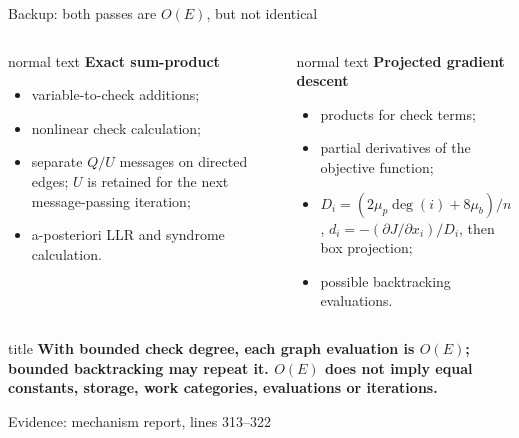 \documentclass[aspectratio=169,9pt,t]{beamer}
\newcommand{\evidence}[1]{%
  \vfill\hfill{\fontsize{5.8}{6.8}\selectfont\color{Muted}Evidence: #1}}
\newcommand{\takeaway}[1]{%
  \begin{beamercolorbox}[rounded=true,sep=1.5ex]{title}
    \centering\normalsize\bfseries #1
  \end{beamercolorbox}}
\begin{document}
\appendix

\begin{frame}{Backup: both passes are \texorpdfstring{$O(E)$}{O(E)}, but not identical}
  \begin{columns}[T,onlytextwidth]
    \begin{beamercolorbox}[rounded=true,sep=1.3ex]{normal text}
      \textcolor{BP}{\large\bfseries Exact sum-product}
      \begin{itemize}
        \item variable-to-check additions;
        \item nonlinear check calculation;
        \item separate $Q/U$ messages on directed edges; $U$ is retained for the next message-passing iteration;
        \item a-posteriori LLR and syndrome calculation.
      \end{itemize}
    \end{beamercolorbox}
    \begin{beamercolorbox}[rounded=true,sep=1.3ex]{normal text}
      \textcolor{GD}{\large\bfseries Projected gradient descent}
      \begin{itemize}
        \item products for check terms;
        \item partial derivatives of the objective function;
        \item $D_i=(2\mu_p\deg(i)+8\mu_b)/n$, $d_i=-(\partial J/\partial x_i)/D_i$, then box projection;
        \item possible backtracking evaluations.
      \end{itemize}
    \end{beamercolorbox}
  \end{columns}

  \vspace{8mm}
  \takeaway{With bounded check degree, each graph evaluation is $O(E)$; bounded backtracking may repeat it. $O(E)$ does not imply equal constants, storage, work categories, evaluations or iterations.}
  \evidence{mechanism report, lines 313--322}
\end{frame}
\end{document}
